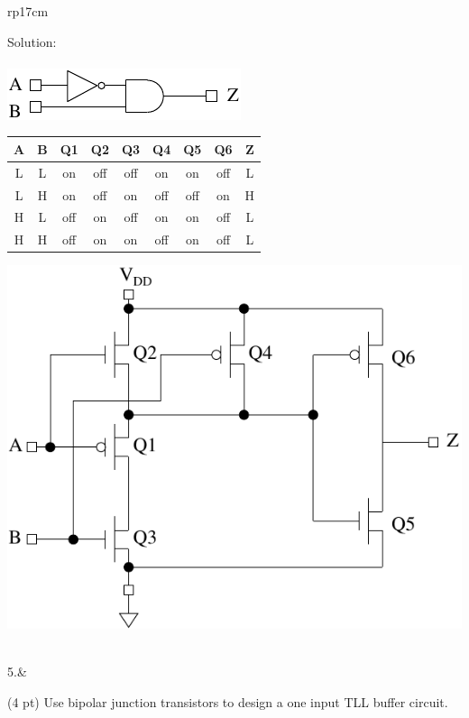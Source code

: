 \documentclass{article}
\begin{document}
\begin{longtable}[l]{rp{17cm}}
\begin{minipage}[t]{\linewidth}
Solution: \\ \\
\includegraphics{../CMOSCircuits/Assessments/Wakerly_3_61Logic}
\medskip
\begin{tabular}{ccccccccc}
  \textbf{A} & \textbf{B} & \textbf{Q1} & \textbf{Q2} & \textbf{Q3} & \textbf{Q4} & \textbf{Q5} & \textbf{Q6} & \textbf{Z} \\
  \hline
  L & L & on & off & off & on & on & off & L\\
  L & H & on & off & on & off & off & on & H\\
  H & L & off & on & off & on & on & off & L\\
  H & H & off & on & on & off & on & off & L\\
\end{tabular}
\medskip
\includegraphics{../CMOSCircuits/Assessments/Wakerly_3_61CMOS}
\end{minipage}\\
\medskip
5.&\begin{minipage}[t]{\linewidth}(4 pt) Use bipolar junction transistors to design a one input TLL buffer circuit.\\ \\


\end{minipage}
\end{longtable}
\end{document}
